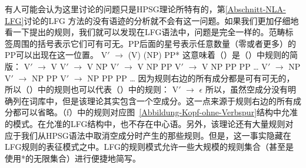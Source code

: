 有人可能会认为这里讨论的问题只是HPSG\indexlfgstartc 理论所特有的，第\ref{Abschnitt-NLA-LFG}讨论的LFG
方法的没有语迹的分析就不会有这一问题。如果我们更加仔细地看一下\citet[]{Dalrymple2006a}提出的规则，我们就可以发现在LFG语法中，问题是完全一样的。范畴标签周围的括号表示它们可有可无。PP后面的星号表示任意数量（零或者更多）的PP可以出现在这一位置。
\ea
V$'$ $\to$ (V) (NP) PP*
\z
这意味着（）是（）中规则的简版：
\eal
\ex V$'$ $\to$ V
\ex V$'$ $\to$ V NP
\ex V$'$ $\to$ V NP PP
\ex V$'$ $\to$ V NP PP PP
\ex \ldots
\ex V$'$ $\to$ NP
\ex V$'$ $\to$ NP PP
\ex V$'$ $\to$ NP PP PP
\ex \ldots
\zl
因为规则右边的所有成分都是可有可无的，所以（）中的规则也可以代表（）中的规则：
\ea
V$'$ $\to$ $\epsilon$
\z
所以，虽然空成分没有明确列在词库中，但是该理论其实包含一个空成分。这一点来源于规则右边的所有成分都可以省略。（f）中的规则对应图~\ref{Abbildung-Kopf-ohne-Verbspur}结构中允准的模式。在允准的LFG结构中，也不存在中心语。另外，该理论还有大量规则对应于我们从HPSG语法中取消空成分时产生的那些规则。但是，这一事实隐藏在LFG规则的表征模式之中。LFG的规则模式允许一些大规模的规则集合（甚至是使用*的无限集合）进行便捷地简写\indexlfgendc。

